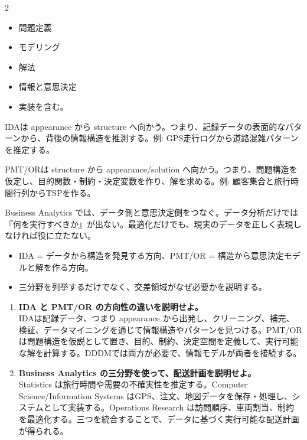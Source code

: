\clearpage
{}
\begin{multicols}{2}\footnotesize\raggedcolumns
{}
\begin{itemize}
\item 問題定義
\item モデリング
\item 解法
\item 情報と意思決定
\item 実装を含む。
\end{itemize}
IDAは appearance から structure へ向かう。つまり、記録データの表面的なパターンから、背後の情報構造を推測する。例: GPS走行ログから道路混雑パターンを推定する。\par

PMT/ORは structure から appearance/solution へ向かう。つまり、問題構造を仮定し、目的関数・制約・決定変数を作り、解を求める。例: 顧客集合と旅行時間行列からTSPを作る。\par

Business Analytics では、データ側と意思決定側をつなぐ。データ分析だけでは『何を実行すべきか』が出ない。最適化だけでも、現実のデータを正しく表現しなければ役に立たない。\par
{}
\begin{itemize}
\item IDA = データから構造を発見する方向、PMT/OR = 構造から意思決定モデルと解を作る方向。
\item 三分野を列挙するだけでなく、交差領域がなぜ必要かを説明する。
\end{itemize}
\begin{enumerate}
\item \textbf{IDA と PMT/OR の方向性の違いを説明せよ。}\\IDAは記録データ、つまり appearance から出発し、クリーニング、補完、検証、データマイニングを通じて情報構造やパターンを見つける。PMT/ORは問題構造を仮説として置き、目的、制約、決定空間を定義して、実行可能な解を計算する。DDDMでは両方が必要で、情報モデルが両者を接続する。
\item \textbf{Business Analytics の三分野を使って、配送計画を説明せよ。}\\Statistics は旅行時間や需要の不確実性を推定する。Computer Science/Information Systems はGPS、注文、地図データを保存・処理し、システムとして実装する。Operations Research は訪問順序、車両割当、制約を最適化する。三つを統合することで、データに基づく実行可能な配送計画が得られる。
\end{enumerate}
\end{multicols}

